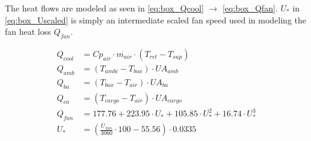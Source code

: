 
The heat flows are modeled as seen in \cref{eq:box_Qcool} $\rightarrow$ \cref{eq:box_Qfan}. $ U_* $ in \cref{eq:box_Uscaled} is simply an intermediate scaled fan speed used in modeling the fan heat loss $ Q_{fan} $.

\begin{align}
	Q_{cool}   & = Cp_{air} \cdot \dot{m_{air}} \cdot (T_{ret} - T_{sup})	\label{eq:box_Qcool}                                 \\
	Q_{amb}    & = (T_{ambi} - T_{box}) \cdot U A_{amb}						\label{eq:box_Qab}                                                \\
	Q_{ba}     & = (T_{box} - T_{air}) \cdot U A_{ba}						\label{eq:box_Qba}                                                  \\
	Q_{ca}     & = (T_{cargo} - T_{air}) \cdot U A_{cargo}                                                                     \\
	Q_{fan}    & = 177.76 + 223.95 \cdot U_* + 105.85 \cdot U_*^2 + 16.74 \cdot U_*^3 \label{eq:box_Qfan} \\
	U_* & = \left( \frac{U_{fan}}{3060}\cdot 100 - 55.56 \right) \cdot 0.0335 \label{eq:box_Uscaled}
\end{align}

